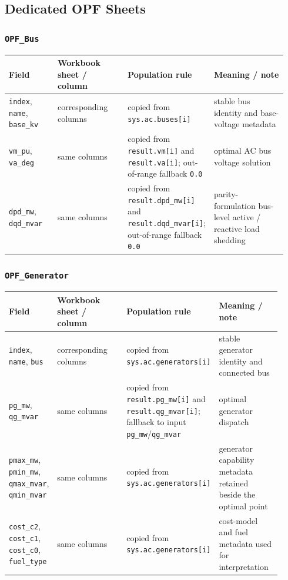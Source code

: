 \subsection{Dedicated OPF Sheets}

\subsubsection*{\texttt{OPF\_Bus}}

\begin{longtable}{@{}L{0.18\linewidth}L{0.26\linewidth}L{0.22\linewidth}L{0.28\linewidth}@{}}
\toprule
Field & Workbook sheet / column & Population rule & Meaning / note \\
\midrule
\endhead
\texttt{index}, \texttt{name}, \texttt{base\_kv} & corresponding columns & copied from \texttt{sys.ac.buses[i]} & stable bus identity and base-voltage metadata \\
\texttt{vm\_pu}, \texttt{va\_deg} & same columns & copied from \texttt{result.vm[i]} and \texttt{result.va[i]}; out-of-range fallback \texttt{0.0} & optimal AC bus voltage solution \\
\texttt{dpd\_mw}, \texttt{dqd\_mvar} & same columns & copied from \texttt{result.dpd\_mw[i]} and \texttt{result.dqd\_mvar[i]}; out-of-range fallback \texttt{0.0} & parity-formulation bus-level active / reactive load shedding \\
\bottomrule
\end{longtable}

\subsubsection*{\texttt{OPF\_Generator}}

\begin{longtable}{@{}L{0.17\linewidth}L{0.29\linewidth}L{0.22\linewidth}L{0.24\linewidth}@{}}
\toprule
Field & Workbook sheet / column & Population rule & Meaning / note \\
\midrule
\endhead
\texttt{index}, \texttt{name}, \texttt{bus} & corresponding columns & copied from \texttt{sys.ac.generators[i]} & stable generator identity and connected bus \\
\texttt{pg\_mw}, \texttt{qg\_mvar} & same columns & copied from \texttt{result.pg\_mw[i]} and \texttt{result.qg\_mvar[i]}; fallback to input \texttt{pg\_mw}/\texttt{qg\_mvar} & optimal generator dispatch \\
\texttt{pmax\_mw}, \texttt{pmin\_mw}, \texttt{qmax\_mvar}, \texttt{qmin\_mvar} & same columns & copied from \texttt{sys.ac.generators[i]} & generator capability metadata retained beside the optimal point \\
\texttt{cost\_c2}, \texttt{cost\_c1}, \texttt{cost\_c0}, \texttt{fuel\_type} & same columns & copied from \texttt{sys.ac.generators[i]} & cost-model and fuel metadata used for interpretation \\
\bottomrule
\end{longtable}

